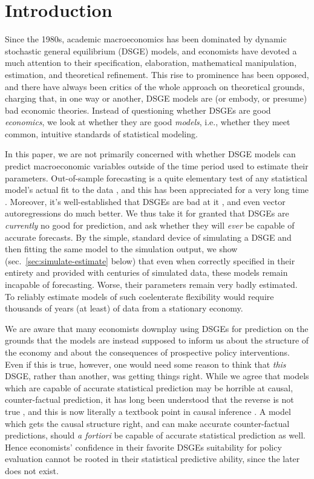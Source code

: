 \documentclass[11pt]{article}
\begin{document}
\hypertarget{introduction}{%
\section{Introduction}\label{introduction}}

Since the 1980s, academic macroeconomics has been dominated by dynamic
stochastic general equilibrium (DSGE) models, and economists have
devoted a much attention to their specification, elaboration,
mathematical manipulation, estimation, and theoretical refinement. This
rise to prominence has been opposed, and there have always been critics
of the whole approach on theoretical grounds, charging that, in one way
or another, DSGE models are (or embody, or presume) bad economic
theories. Instead of questioning whether DSGEs are good
\emph{economics}, we look at whether they are good \emph{models}, i.e.,
whether they meet common, intuitive standards of statistical modeling.

In this paper, we are not primarily concerned with whether DSGE models
can predict macroeconomic variables outside of the time period used to
estimate their parameters. Out-of-sample forecasting is a quite
elementary test of any statistical model's actual fit to the data
\citep{tEoSL-2nd}, and this has been appreciated for a very long time
\citep{Stone1974,Geisser-predictive-sample-reuse,Geisser-Eddy-predictive-approach}.
Moreover, it's well-established that DSGEs are bad at it
\citep{Edge-Gurkaynak-on-dsges}, and even vector autoregressions do much
better. We thus take it for granted that DSGEs are \emph{currently} no
good for prediction, and ask whether they will \emph{ever} be capable of
accurate forecasts. By the simple, standard device of simulating a DSGE
and then fitting the same model to the simulation output, we show
(sec.~\ref{sec:simulate-estimate} below) that even when correctly
specified in their entirety and provided with centuries of simulated
data, these models remain incapable of forecasting. Worse, their
parameters remain very badly estimated. To reliably estimate models of
such coelenterate flexibility would require thousands of years (at
least) of data from a stationary economy.

We are aware that many economists downplay using DSGEs for prediction on
the grounds that the models are instead supposed to inform us about the
structure of the economy and about the consequences of prospective
policy interventions. Even if this is true, however, one would need some
reason to think that \emph{this} DSGE, rather than another, was getting
things right. While we agree that models which are capable of accurate
statistical prediction may be horrible at causal, counter-factual
prediction, it has long been understood that the reverse is not true
\citep{Spirtes-Glymour-Scheines-1st, Pearl-causality}, and this is now
literally a textbook point in causal inference
\citep{Morgan-Winship-counterfactuals-2nd}. A model which gets the
causal structure right, and can make accurate counter-factual
predictions, should \emph{a fortiori} be capable of accurate statistical
prediction as well. Hence economists' confidence in their favorite DSGEs
suitability for policy evaluation cannot be rooted in their statistical
predictive ability, since the later does not exist.
\end{document}
